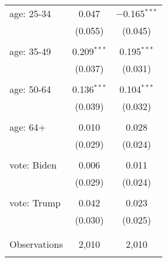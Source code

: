 \begin{tabular}{@{\extracolsep{5pt}}lcc}
 age: 25-34 & 0.047 & $-$0.165$^{***}$ \\ 
  & (0.055) & (0.045) \\ 
  & & \\ 
 age: 35-49 & 0.209$^{***}$ & 0.195$^{***}$ \\ 
  & (0.037) & (0.031) \\ 
  & & \\ 
 age: 50-64 & 0.136$^{***}$ & 0.104$^{***}$ \\ 
  & (0.039) & (0.032) \\ 
  & & \\ 
 age: 64+ & 0.010 & 0.028 \\ 
  & (0.029) & (0.024) \\ 
  & & \\ 
 vote: Biden & 0.006 & 0.011 \\ 
  & (0.029) & (0.024) \\ 
  & & \\ 
 vote: Trump & 0.042 & 0.023 \\ 
  & (0.030) & (0.025) \\ 
  & & \\ 
\hline \\[-1.8ex] 

Observations & 2,010 & 2,010 \\ 
\hline 
\hline \\[-1.8ex] 
\end{tabular} 